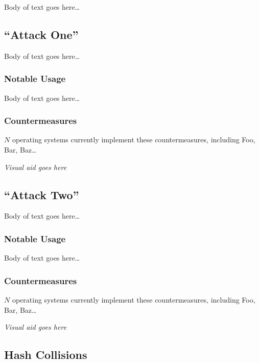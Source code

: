 \documentclass[conference]{IEEEtran}
\begin{document}
Body of text goes here\ldots

\subsection{``Attack One''}

Body of text goes here\ldots

\subsubsection{Notable Usage}

Body of text goes here\ldots

\subsubsection{Countermeasures}

$N$ operating systems currently implement these countermeasures, including Foo, Bar, Baz\ldots

\textit{Visual aid goes here}

\subsection{``Attack Two''}

Body of text goes here\ldots

\subsubsection{Notable Usage}

Body of text goes here\ldots

\subsubsection{Countermeasures}

$N$ operating systems currently implement these countermeasures, including Foo, Bar, Baz\ldots

\textit{Visual aid goes here}

\subsection{Hash Collisions}
\end{document}
